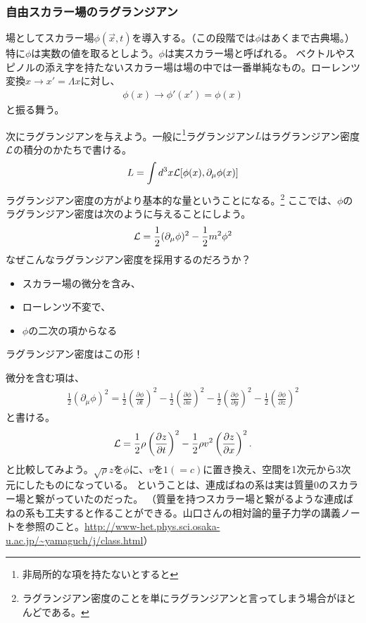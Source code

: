 \documentclass[10pt,a4paper]{jarticle}
\begin{document}
\subsubsection{自由スカラー場のラグランジアン}
場としてスカラー場$\phi(\vec x,t)$を導入する。（この段階では$\phi$はあくまで古典場。）
特に$\phi$は実数の値を取るとしよう。$\phi$は実スカラー場と呼ばれる。
ベクトルやスピノルの添え字を持たないスカラー場は場の中では一番単純なもの。ローレンツ変換$x \to x' = \Lambda x$に対し、
\begin{align}
\phi(x) \to \phi'(x') = \phi(x)
\end{align}
と振る舞う。

次にラグランジアンを与えよう。一般に\footnote{非局所的な項を持たないとすると}ラグランジアン$L$はラグランジアン密度${\cal L}$の積分のかたちで書ける。
\begin{align}
L = \int d^3x {\cal L}[\phi(x), \partial_\mu \phi(x)]
\end{align}
ラグランジアン密度の方がより基本的な量ということになる。\footnote{ラグランジアン密度のことを単にラグランジアンと言ってしまう場合がほとんどである。}
ここでは、$\phi$のラグランジアン密度は次のように与えることにしよう。
\begin{align}
{\cal L} = \frac{1}{2}(\partial_\mu \phi)^2 - \frac{1}{2}m^2\phi^2 \label{eq:Lagrangian free scalar}
\end{align}
なぜこんなラグランジアン密度を採用するのだろうか？
\begin{itemize}
\item スカラー場の微分を含み、
\item ローレンツ不変で、
\item $\phi$の二次の項からなる
\end{itemize}
ラグランジアン密度はこの形！

微分を含む項は、
\begin{align}
\frac{1}{2}(\partial_\mu \phi)^2
=
\frac{1}{2}\left( \frac{\partial\phi}{\partial t} \right)^2
- \frac{1}{2}\left( \frac{\partial\phi}{\partial x} \right)^2
- \frac{1}{2}\left( \frac{\partial\phi}{\partial y} \right)^2
- \frac{1}{2}\left( \frac{\partial\phi}{\partial z} \right)^2
\end{align}
と書ける。
\begin{align}
{\cal L} =
 \frac{1}{2} \rho \left( \frac{\partial z}{\partial t} \right)^2
 -  \frac{1}{2} \rho v^2 \left( \frac{\partial z}{\partial x} \right)^2.
\end{align}
と比較してみよう。$\sqrt{\rho} z$を$\phi$に、$v$を$1 (=c)$に置き換え、空間を1次元から3次元にしたものになっている。
ということは、連成ばねの系は実は質量0のスカラー場と繋がっていたのだった。
（質量を持つスカラー場と繋がるような連成ばねの系も工夫すると作ることができる。山口さんの相対論的量子力学の講義ノートを参照のこと。\url{http://www-het.phys.sci.osaka-u.ac.jp/~yamaguch/j/class.html}）
\end{document}
